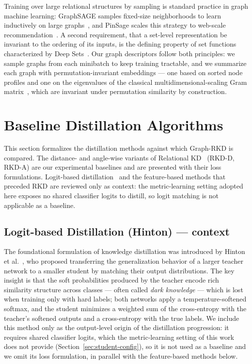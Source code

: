 \documentclass[11pt,letterpaper]{article}
\begin{document}
Training over large relational structures by sampling is standard practice in graph
machine learning: GraphSAGE samples fixed-size neighborhoods to learn inductively on
large graphs~\cite{hamilton2017graphsage}, and PinSage scales this strategy to
web-scale recommendation~\cite{ying2018pinsage}. A second requirement, that a
set-level representation be invariant to the ordering of its inputs, is the defining
property of set functions characterized by Deep Sets~\cite{zaheer2017deepsets}. Our
graph descriptors follow both principles: we sample graphs from each minibatch to
keep training tractable, and we summarize each graph with permutation-invariant
embeddings --- one based on sorted node profiles and one on the eigenvalues of the
classical multidimensional-scaling Gram matrix~\cite{torgerson1952mds,cox2000mds},
which are invariant under permutation similarity by construction.

\section{Baseline Distillation Algorithms}
\label{sec:kd-algorithms}

This section formalizes the distillation methods against which Graph-RKD is
compared. The distance- and angle-wise variants of Relational
KD~\cite{park2019relational} (RKD-D, RKD-A) are our experimental baselines and are
presented with their loss formulations. Logit-based
distillation~\cite{hinton2015distilling} and the feature-based methods that preceded
RKD are reviewed only as context: the metric-learning setting adopted here exposes no
shared classifier logits to distill, so logit matching is not applicable as a
baseline.

\subsection{Logit-based Distillation (Hinton) --- context}
\label{sec:kd-hinton}

The foundational formulation of knowledge distillation was introduced by Hinton et
al.~\cite{hinton2015distilling}, who proposed transferring the generalization behavior of a
larger teacher network to a smaller student by matching their output distributions. The key
insight is that the soft probabilities produced by the teacher encode rich similarity
structure across classes --- often called \emph{dark knowledge} --- which is lost when
training only with hard labels; both networks apply a temperature-softened softmax, and the
student minimizes a weighted sum of the cross-entropy with the teacher's softened outputs and
a cross-entropy with the true labels. We include this method only as the output-level origin
of the distillation progression: it requires shared classifier logits, which the
metric-learning setting of this work does not provide
(Section~\ref{sec:student-config}), so it is not used as a baseline and we omit its loss
formulation, in parallel with the feature-based methods below.
\end{document}
